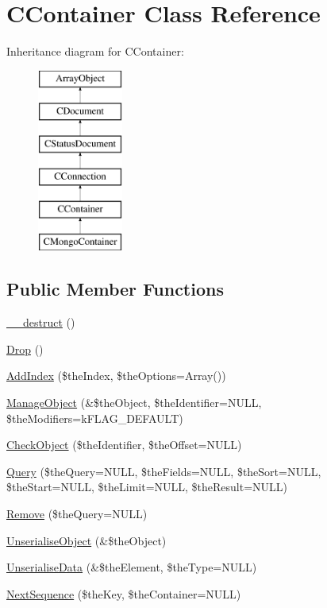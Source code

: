 \hypertarget{class_c_container}{\section{C\-Container Class Reference}
\label{class_c_container}
}
Inheritance diagram for C\-Container\-:\begin{figure}[H]
\begin{center}
\leavevmode
\includegraphics[height=6.000000cm]{class_c_container}
\end{center}
\end{figure}
\subsection*{Public Member Functions}
\begin{DoxyCompactItemize}
\item 
\hyperlink{class_c_container_acc336649ca3737a5870ca808a735101c}{\-\_\-\-\_\-destruct} ()
\item 
\hyperlink{class_c_container_ae896641925887415d2b364fadc894904}{Drop} ()
\item 
\hyperlink{class_c_container_ade4cbaf7d8aecd823a5b2342ebe9a79f}{Add\-Index} (\$the\-Index, \$the\-Options=Array())
\item 
\hyperlink{class_c_container_ae2a912b433ba916ce5af0b21d657243b}{Manage\-Object} (\&\$the\-Object, \$the\-Identifier=N\-U\-L\-L, \$the\-Modifiers=k\-F\-L\-A\-G\-\_\-\-D\-E\-F\-A\-U\-L\-T)
\item 
\hyperlink{class_c_container_abbb981df971e40d73bc530209c184028}{Check\-Object} (\$the\-Identifier, \$the\-Offset=N\-U\-L\-L)
\item 
\hyperlink{class_c_container_a9f422d5c6d99eea28993614749ee05a3}{Query} (\$the\-Query=N\-U\-L\-L, \$the\-Fields=N\-U\-L\-L, \$the\-Sort=N\-U\-L\-L, \$the\-Start=N\-U\-L\-L, \$the\-Limit=N\-U\-L\-L, \$the\-Result=N\-U\-L\-L)
\item 
\hyperlink{class_c_container_a1deac33bfa698889c45d9021a274392a}{Remove} (\$the\-Query=N\-U\-L\-L)
\item 
\hyperlink{class_c_container_aa339d3c4c9b011713176a89fe9c7783d}{Unserialise\-Object} (\&\$the\-Object)
\item 
\hyperlink{class_c_container_a02b227658d1799d3608973312f67b28c}{Unserialise\-Data} (\&\$the\-Element, \$the\-Type=N\-U\-L\-L)
\item 
\hyperlink{class_c_container_afa72f0da28ad8c3955cb9fedbc0ac2df}{Next\-Sequence} (\$the\-Key, \$the\-Container=N\-U\-L\-L)
\end{DoxyCompactItemize}
